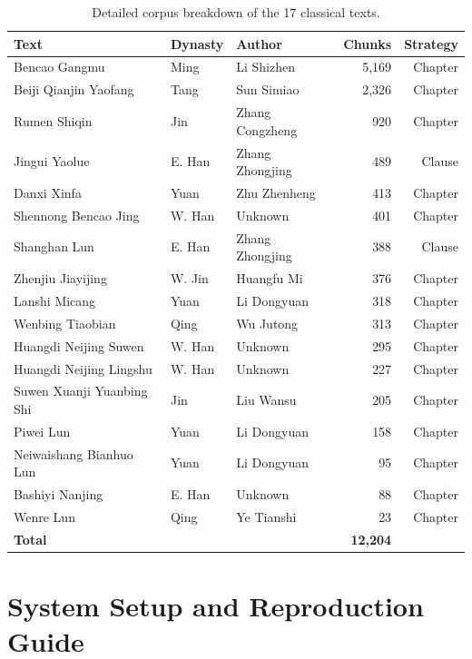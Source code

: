 \documentclass[11pt,a4paper]{report}
\begin{document}
\begin{table}[H]
\centering
\caption{Detailed corpus breakdown of the 17 classical texts.}
\label{tab:corpus_detail}
\begin{tabularx}{\textwidth}{>{\raggedright\arraybackslash}X>{\raggedright\arraybackslash}l>{\raggedright\arraybackslash}Xrr}
\toprule
\textbf{Text} & \textbf{Dynasty} & \textbf{Author} & \textbf{Chunks} & \textbf{Strategy} \\
\midrule
Bencao Gangmu & Ming & Li Shizhen & 5,169 & Chapter \\
Beiji Qianjin Yaofang & Tang & Sun Simiao & 2,326 & Chapter \\
Rumen Shiqin & Jin & Zhang Congzheng & 920 & Chapter \\
Jingui Yaolue & E. Han & Zhang Zhongjing & 489 & Clause \\
Danxi Xinfa & Yuan & Zhu Zhenheng & 413 & Chapter \\
Shennong Bencao Jing & W. Han & Unknown & 401 & Chapter \\
Shanghan Lun & E. Han & Zhang Zhongjing & 388 & Clause \\
Zhenjiu Jiayijing & W. Jin & Huangfu Mi & 376 & Chapter \\
Lanshi Micang & Yuan & Li Dongyuan & 318 & Chapter \\
Wenbing Tiaobian & Qing & Wu Jutong & 313 & Chapter \\
Huangdi Neijing Suwen & W. Han & Unknown & 295 & Chapter \\
Huangdi Neijing Lingshu & W. Han & Unknown & 227 & Chapter \\
Suwen Xuanji Yuanbing Shi & Jin & Liu Wansu & 205 & Chapter \\
Piwei Lun & Yuan & Li Dongyuan & 158 & Chapter \\
Neiwaishang Bianhuo Lun & Yuan & Li Dongyuan & 95 & Chapter \\
Bashiyi Nanjing & E. Han & Unknown & 88 & Chapter \\
Wenre Lun & Qing & Ye Tianshi & 23 & Chapter \\
\midrule
\textbf{Total} & & & \textbf{12,204} & \\
\bottomrule
\end{tabularx}
\end{table}

\chapter{System Setup and Reproduction Guide}
\end{document}
